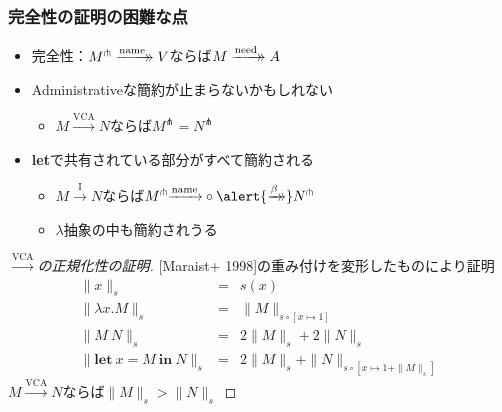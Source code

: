 \documentclass[dvipdfmx,cjk,xcolor=dvipsnames,envcountsect,notheorems,12pt]{beamer}
\theoremstyle{definition}
\newcommand{\xtwoheadrightarrow}[2][]{%
  \xrightarrow[#1]{#2}\mathrel{\mkern-14mu}\rightarrow
}
\newcommand{\LET}[3]{\mathbf{let}~#1=#2~\mathbf{in}~#3}
\newcommand{\EXPANDLET}[1]{#1^\pitchfork}
\newcommand{\SIZE}[2]{\parallel #1 \parallel_{#2}}
\newcommand{\CALLBYNEEDI}{\xrightarrow{\mathrm{I}}}
\newcommand{\CALLBYNEEDVCA}{\xrightarrow{\mathrm{VCA}}}
\newcommand{\CALLBYNAME}{\xrightarrow{\mathrm{name}}}
\newcommand{\RTCLOSFULLBETA}{\xtwoheadrightarrow{\beta}}
\newcommand{\RTCLOSCALLBYNEED}{\xtwoheadrightarrow{\mathrm{need}}}
\newcommand{\RTCLOSCALLBYNAME}{\xtwoheadrightarrow{\mathrm{name}}}
\begin{document}
\begin{frame}
	\frametitle{完全性の証明の困難な点}
	\begin{itemize}
		\item 完全性：$\EXPANDLET{M}\RTCLOSCALLBYNAME V$ならば$M\RTCLOSCALLBYNEED A$
		\item Administrativeな簡約が止まらないかもしれない
			\begin{itemize}
				\item $M\CALLBYNEEDVCA N$ならば$\EXPANDLET{M}=\EXPANDLET{N}$
			\end{itemize}
		\item \textbf{let}で共有されている部分がすべて簡約される
			\begin{itemize}
				\item $M\CALLBYNEEDI N$ならば$\EXPANDLET{M}{\CALLBYNAME}\circ{\alert{\RTCLOSFULLBETA}}\EXPANDLET{N}$
				\item $\lambda$抽象の中も簡約されうる
			\end{itemize}
	\end{itemize}
\end{frame}

\begin{frame}
	\Large
	\begin{proof}[$\CALLBYNEEDVCA$の正規化性の証明]
		{[Maraist+ 1998]}の重み付けを変形したものにより証明
		{\normalsize \[ \begin{array}{rcl}
		\SIZE{x}{s} & = & s(x) \\
		\SIZE{\lambda x. M}{s} & = & \SIZE{M}{s \circ [x \mapsto 1]} \\
		\SIZE{M~N}{s} & = & 2\SIZE{M}{s}+2\SIZE{N}{s} \\
		\SIZE{\LET{x}{M}{N}}{s} & = & 2\SIZE{M}{s}+\SIZE{N}{s \circ [x \mapsto 1+\SIZE{M}{s}]}
		\end{array} \]}
		$M\CALLBYNEEDVCA N$ならば$\SIZE{M}{s}>\SIZE{N}{s}$
	\end{proof}
\end{frame}
\end{document}
